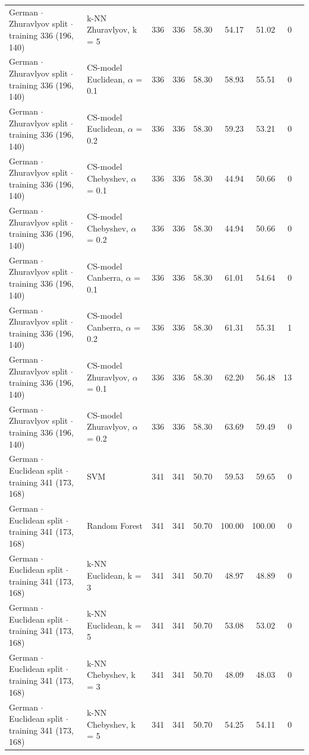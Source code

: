 \begin{longtable}{llrrrrrrl}
  German $\cdot$ Zhuravlyov split $\cdot$ training 336 (196, 140) & k-NN Zhuravlyov, k = 5 & 336 & 336 & 58.30 & 54.17 & 51.02 & 0 &  \\
  German $\cdot$ Zhuravlyov split $\cdot$ training 336 (196, 140) & CS-model Euclidean, $\alpha$ = 0.1 & 336 & 336 & 58.30 & 58.93 & 55.51 & 0 &  \\
  German $\cdot$ Zhuravlyov split $\cdot$ training 336 (196, 140) & CS-model Euclidean, $\alpha$ = 0.2 & 336 & 336 & 58.30 & 59.23 & 53.21 & 0 &  \\
  German $\cdot$ Zhuravlyov split $\cdot$ training 336 (196, 140) & CS-model Chebyshev, $\alpha$ = 0.1 & 336 & 336 & 58.30 & 44.94 & 50.66 & 0 &  \\
  German $\cdot$ Zhuravlyov split $\cdot$ training 336 (196, 140) & CS-model Chebyshev, $\alpha$ = 0.2 & 336 & 336 & 58.30 & 44.94 & 50.66 & 0 &  \\
  German $\cdot$ Zhuravlyov split $\cdot$ training 336 (196, 140) & CS-model Canberra, $\alpha$ = 0.1 & 336 & 336 & 58.30 & 61.01 & 54.64 & 0 &  \\
  German $\cdot$ Zhuravlyov split $\cdot$ training 336 (196, 140) & CS-model Canberra, $\alpha$ = 0.2 & 336 & 336 & 58.30 & 61.31 & 55.31 & 1 &  \\
  German $\cdot$ Zhuravlyov split $\cdot$ training 336 (196, 140) & CS-model Zhuravlyov, $\alpha$ = 0.1 & 336 & 336 & 58.30 & 62.20 & 56.48 & 13 &  \\
  German $\cdot$ Zhuravlyov split $\cdot$ training 336 (196, 140) & CS-model Zhuravlyov, $\alpha$ = 0.2 & 336 & 336 & 58.30 & 63.69 & 59.49 & 0 &  \\
  German $\cdot$ Euclidean split $\cdot$ training 341 (173, 168) & SVM & 341 & 341 & 50.70 & 59.53 & 59.65 & 0 &  \\
  German $\cdot$ Euclidean split $\cdot$ training 341 (173, 168) & Random Forest & 341 & 341 & 50.70 & 100.00 & 100.00 & 0 &  \\
  German $\cdot$ Euclidean split $\cdot$ training 341 (173, 168) & k-NN Euclidean, k = 3 & 341 & 341 & 50.70 & 48.97 & 48.89 & 0 &  \\
  German $\cdot$ Euclidean split $\cdot$ training 341 (173, 168) & k-NN Euclidean, k = 5 & 341 & 341 & 50.70 & 53.08 & 53.02 & 0 &  \\
  German $\cdot$ Euclidean split $\cdot$ training 341 (173, 168) & k-NN Chebyshev, k = 3 & 341 & 341 & 50.70 & 48.09 & 48.03 & 0 &  \\
  German $\cdot$ Euclidean split $\cdot$ training 341 (173, 168) & k-NN Chebyshev, k = 5 & 341 & 341 & 50.70 & 54.25 & 54.11 & 0 &  \\

\end{longtable}
